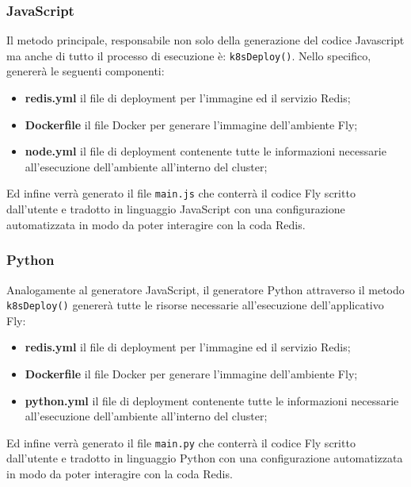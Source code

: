 \subsubsection{JavaScript}
Il metodo principale, responsabile non solo della generazione del codice Javascript ma anche di tutto il processo di esecuzione è: \verb|k8sDeploy()|. 
Nello specifico, genererà le seguenti componenti:

\begin{itemize}
  \item\textbf{redis.yml} il file di deployment per l'immagine ed il servizio Redis;
  \item\textbf{Dockerfile} il file Docker per generare l'immagine dell'ambiente Fly;
  \item\textbf{node.yml} il file di deployment contenente tutte le informazioni necessarie all'esecuzione dell'ambiente all'interno del cluster;
\end{itemize}

Ed infine verrà generato il file \verb|main.js| che conterrà il codice Fly scritto dall'utente e tradotto in linguaggio JavaScript con una configurazione automatizzata in modo da poter interagire con la coda Redis.

\subsubsection{Python}
Analogamente al generatore JavaScript, il generatore Python attraverso il metodo \verb|k8sDeploy()| genererà tutte le risorse necessarie all'esecuzione dell'applicativo Fly:

\begin{itemize}
  \item\textbf{redis.yml} il file di deployment per l'immagine ed il servizio Redis;
  \item\textbf{Dockerfile} il file Docker per generare l'immagine dell'ambiente Fly;
  \item\textbf{python.yml} il file di deployment contenente tutte le informazioni necessarie all'esecuzione dell'ambiente all'interno del cluster;
\end{itemize}

Ed infine verrà generato il file \verb|main.py| che conterrà il codice Fly scritto dall'utente e tradotto in linguaggio Python con una configurazione automatizzata in modo da poter interagire con la coda Redis.